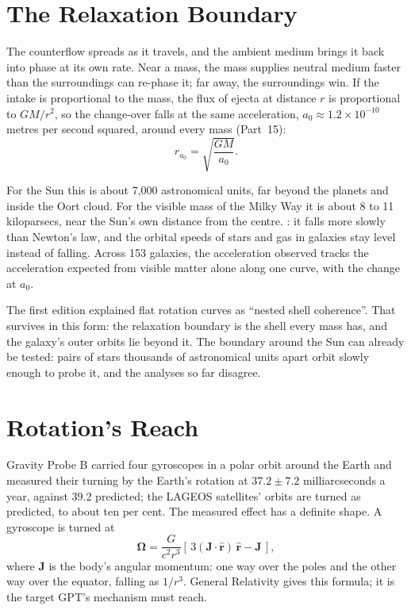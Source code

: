 \documentclass[11pt,a4paper]{article}
\begin{document}
\section{The Relaxation Boundary}
\label{sec:boundary}

\begin{hypbar}
The counterflow spreads as it travels, and the ambient medium brings it back into phase at its own rate. Near a mass, the mass supplies neutral medium faster than the surroundings can re-phase it; far away, the surroundings win. If the intake is proportional to the mass, the flux of ejecta at distance $r$ is proportional to $GM/r^2$, so the change-over falls at the same acceleration, $a_0 \approx 1.2\times10^{-10}$ metres per second squared, around every mass (Part~15):
\begin{equation}
r_{a_0} = \sqrt{\frac{GM}{a_0}} .
\end{equation}
\end{hypbar}

For the Sun this is about 7,000 astronomical units, far beyond the planets and inside the Oort cloud. For the visible mass of the Milky Way it is about 8 to 11 kiloparsecs, near the Sun's own distance from the centre. : it falls more slowly than Newton's law, and the orbital speeds of stars and gas in galaxies stay level instead of falling. Across 153 galaxies, the acceleration observed tracks the acceleration expected from visible matter alone along one curve, with the change at $a_0$.

The first edition explained flat rotation curves as ``nested shell coherence''. That survives in this form: the relaxation boundary is the shell every mass has, and the galaxy's outer orbits lie beyond it.  The boundary around the Sun can already be tested: pairs of stars thousands of astronomical units apart orbit slowly enough to probe it, and the analyses so far disagree.

\section{Rotation's Reach}
\label{sec:rotation}

 Gravity Probe B carried four gyroscopes in a polar orbit around the Earth and measured their turning by the Earth's rotation at $37.2 \pm 7.2$ milliarcseconds a year, against 39.2 predicted; the LAGEOS satellites' orbits are turned as predicted, to about ten per cent. The measured effect has a definite shape. A gyroscope is turned at
\begin{equation}
\boldsymbol{\Omega} = \frac{G}{c^2 r^3}\left[\,3(\mathbf{J}\cdot\hat{\mathbf{r}})\,\hat{\mathbf{r}} - \mathbf{J}\,\right],
\end{equation}
where $\mathbf{J}$ is the body's angular momentum: one way over the poles and the other way over the equator, falling as $1/r^3$. General Relativity gives this formula; it is the target GPT's mechanism must reach.
\end{document}
